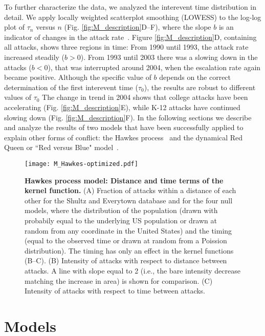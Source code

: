 To further characterize the data, we analyzed the interevent time
distribution in detail.  We apply locally weighted scatterplot
smoothing (LOWESS) to the log-log plot of $\tau_n$ versus $n$
(Fig. \ref{fig:M_description}D--F), where the slope $b$ is an
indicator of changes in the attack rate~\cite{Johnson2013b}.  Figure
\ref{fig:M_description}D, containing all attacks, shows three regions
in time: From 1990 until 1993, the attack rate increased steadily
($b>0$).  From 1993 until 2003 there was a slowing down in the attacks
($b<0$), that was interrupted around 2004, when the escalation rate
again became positive.  Although the specific value of $b$ depends on
the correct determination of the first interevent time ($\tau_0$), the
results are robust to different values of $\tau_0$
The change in trend in
2004 shows that college attacks have been accelerating
(Fig. \ref{fig:M_description}E), while K-12 attacks have continued
slowing down (Fig. \ref{fig:M_description}F).  In the following
sections we describe and analyze the results of two models that have
been successfully applied to explain other forms of conflict: the
Hawkes process~\cite{hawkes1971a,hawkes1974cluster,laub2015a} and the
dynamical Red Queen or ``Red versus Blue" model~\cite{Johnson2013b}.

\begin{figure*}[htp!]
  \centering
  \texttt{[image: M\_Hawkes-optimized.pdf]}
  \caption{
    \textbf{Hawkes process model: Distance and time terms of the
      kernel function.} 
    (A) Fraction of attacks within a distance of each other for the Shultz and Everytown database and for the four null models, where the distribution of the population (drawn with probabily equal to
    the underlying US population or drawn at random from any coordinate in the United States) and the timing (equal to the observed time or drawn at random from a Poission distribution). The timing has only an effect in the kernel functions (B--C).
    (B) Intensity of attacks with respect to distance between
    attacks. A line with slope equal to 2 (i.e., the bare intensity
    decrease matching the increase in area) is shown for comparison.
    (C) Intensity of attacks with respect to time between attacks.
  }
  \label{fig:M_Hawkes}
\end{figure*}

 
\section*{Models}

